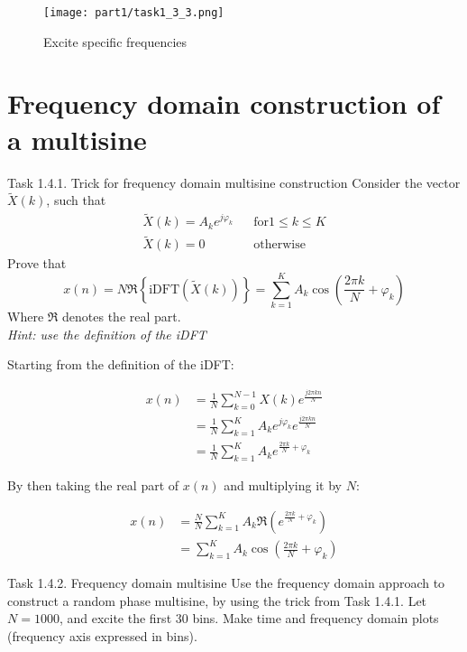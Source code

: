\begin{figure}[H]
    \centering
    \texttt{[image: part1/task1\_3\_3.png]}
    \caption{Excite specific frequencies}
\end{figure}

\section{Frequency domain construction of a multisine}

\begin{Task}{Task 1.4.1. Trick for frequency domain multisine construction}
    Consider the vector $\tilde{X}(k)$, such that
    \begin{align*}
        \tilde{X}(k) = A_ke^{j\varphi _k} && \text{for} 1 \leq k \leq K\\
        \tilde{X}(k) = 0 && \text{otherwise}
    \end{align*}
    Prove that
    \begin{equation*}
        x(n) = N \Re \left\{\text{iDFT}(\tilde{X}(k))\right\} = \sum_{k = 1}^{K} A_k \cos(\frac{2\pi k}{N} + \varphi_k)
    \end{equation*}
    Where $\Re$ denotes the real part.\\
    \textit{Hint: use the definition of the iDFT}
\end{Task}

Starting from the definition of the iDFT:

\begin{align*}
    x(n) &= \frac{1}{N} \sum_{k=0}^{N-1} X(k) e^{\frac{j 2 \pi k n}{N}}\\
    &= \frac{1}{N} \sum_{k = 1}^{K} A_k e^{j \varphi_k} e^{\frac{j 2 \pi k n}{N}}\\
    &= \frac{1}{N} \sum_{k = 1}^{K} A_k e^{\frac{2\pi k}{N} + \varphi_k}
\end{align*}

By then taking the real part of $x(n)$ and multiplying it by $N$:

\begin{align*}
    x(n) &= \frac{N}{N} \sum_{k = 1}^{K} A_k \Re \left(e^{\frac{2\pi k}{N} + \varphi_k}\right)\\
    &= \sum_{k = 1}^{K} A_k \cos(\frac{2\pi k}{N} + \varphi_k)
\end{align*}

\begin{Task}{Task 1.4.2. Frequency domain multisine}
    Use the frequency domain approach to construct a random phase multisine, by using the trick from Task 1.4.1. Let $N = 1000$, and excite the first $30$ bins. Make time and frequency domain plots (frequency axis expressed in bins).
\end{Task}

